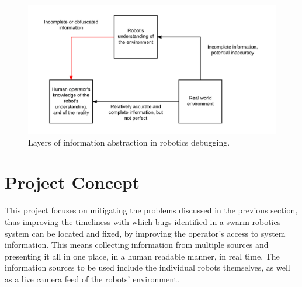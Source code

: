 \begin{figure}
	\centering
	\includegraphics{Figures/RobotDebuggingInformationAbstraction.png}
	\decoRule
	\caption[Debugging information abstraction diagram]{Layers of information abstraction in robotics debugging.}
	\label{fig:DebuggingInformation}
\end{figure}


\section{Project Concept} \label{ProjectConcept}
This project focuses on mitigating the problems discussed in the previous section, thus improving the timeliness with which bugs identified in a swarm robotics system can be located and fixed, by improving the operator's access to system information. This means collecting information from multiple sources and presenting it all in one place, in a human readable manner, in real time. The information sources to be used include the individual robots themselves, as well as a live camera feed of the robots' environment.

